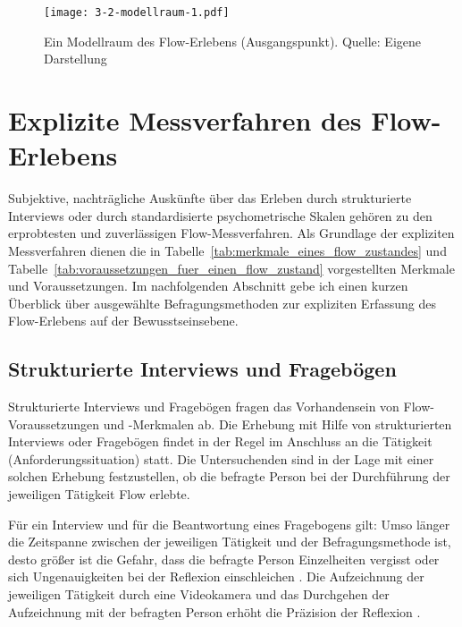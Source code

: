 \begin{sidewaysfigure}
	\texttt{[image: 3-2-modellraum-1.pdf]}
	\caption[Ein Modellraum des Flow-Erlebens (Ausgangspunkt)]{Ein Modellraum des Flow-Erlebens (Ausgangspunkt). Quelle: Eigene Darstellung}
	\label{fig:3_2_modellraum_1}
\end{sidewaysfigure}

\section{Explizite Messverfahren des Flow-Erlebens}
\label{sec:explizite_messverfahren_des_flow_erlebens}

Subjektive, nachträgliche Auskünfte über das Erleben durch strukturierte Interviews oder durch standardisierte psychometrische Skalen gehören zu den erprobtesten und zuverlässigen Flow-Messverfahren. Als Grundlage der expliziten Messverfahren dienen die in Tabelle~\ref{tab:merkmale_eines_flow_zustandes} und Tabelle~\ref{tab:voraussetzungen_fuer_einen_flow_zustand} vorgestellten Merkmale und Voraussetzungen. Im nachfolgenden Abschnitt gebe ich einen kurzen Überblick über ausgewählte Befragungsmethoden zur expliziten Erfassung des Flow-Erlebens auf der Bewusstseinsebene.

\subsection{Strukturierte Interviews und Fragebögen}

Strukturierte Interviews und Fragebögen fragen das Vorhandensein von Flow-Voraussetzungen und -Merkmalen ab. Die Erhebung mit Hilfe von strukturierten Interviews oder Fragebögen findet in der Regel im Anschluss an die Tätigkeit (Anforderungssituation) statt. Die Untersuchenden sind in der Lage mit einer solchen Erhebung festzustellen, ob die befragte Person bei der Durchführung der jeweiligen Tätigkeit Flow erlebte.

Für ein Interview und für die Beantwortung eines Fragebogens gilt: Umso länger die Zeitspanne zwischen der jeweiligen Tätigkeit und der Befragungsmethode ist, desto größer ist die Gefahr, dass die befragte Person Einzelheiten vergisst oder sich Ungenauigkeiten bei der Reflexion einschleichen \citep[vgl.][S.~87]{Henk2014}. Die Aufzeichnung der jeweiligen Tätigkeit durch eine Videokamera und das Durchgehen der Aufzeichnung mit der befragten Person erhöht die Präzision der Reflexion \citep[\emph{Video-Recall}, ][S.~566]{Leuchter2006}.

